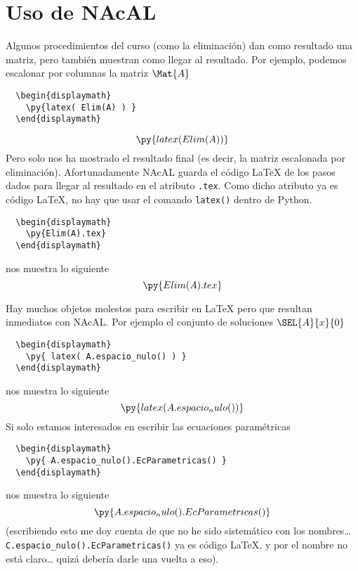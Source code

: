 \documentclass[12pt,a4paper]{article} %
\begin{document}
\section{Uso de NAcAL}
Algunos procedimientos del curso (como la eliminación) dan como
resultado una matriz, pero también muestran como llegar al
resultado. Por ejemplo, podemos escalonar por columnas la matriz
$\Mat{A}$
\begin{Verbatim}
  \begin{displaymath}
    \py{latex( Elim(A) ) }
  \end{displaymath}
\end{Verbatim}
\begin{displaymath}
  \py{latex( Elim(A) ) }
\end{displaymath}
Pero solo nos ha mostrado el resultado final (es decir, la matriz
escalonada por eliminación). Afortunadamente NAcAL guarda el código
\LaTeX{} de los pasos dados para llegar al resultado en el atributo
\texttt{.tex}. Como dicho atributo ya es código \LaTeX{}, no hay que
usar el comando \texttt{latex()} dentro de Python.
\begin{Verbatim}
  \begin{displaymath}
    \py{Elim(A).tex}
  \end{displaymath}
\end{Verbatim}
nos muestra lo siguiente
\begin{displaymath}
  \py{Elim(A).tex}
\end{displaymath}

Hay muchos objetos molestos para escribir en \LaTeX{} pero que
resultan inmediatos con NAcAL. Por ejemplo el conjunto de soluciones
$\SEL{A}{x}{0}$
\begin{Verbatim}
  \begin{displaymath}
    \py{ latex( A.espacio_nulo() ) }
  \end{displaymath}
\end{Verbatim}
nos muestra lo siguiente
\begin{displaymath}
  \py{latex(A.espacio_nulo())}
\end{displaymath}
Si solo estamos interesados en escribir las ecuaciones paramétricas
\begin{Verbatim}
  \begin{displaymath}
    \py{ A.espacio_nulo().EcParametricas() }
  \end{displaymath}
\end{Verbatim}
nos muestra lo siguiente
\begin{displaymath}
  \py{A.espacio_nulo().EcParametricas()}
\end{displaymath}
\DefineShortVerb{\|}
(escribiendo esto me doy cuenta de que no he sido sistemático con los
nombres\ldots{} \Verb+C.espacio_nulo().EcParametricas()+ ya es código
\LaTeX{}, y por el nombre no está claro\dots{} quizá debería darle una
vuelta a eso).  \medskip
\end{document}
